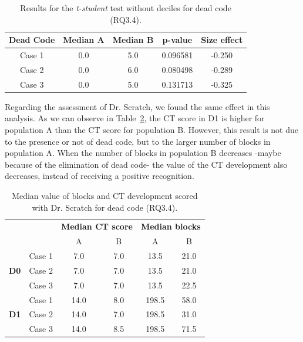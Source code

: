 \begin{table}
 \begin{center}
  \begin{tabular}{|c|c|c|c|c|}
    \hline
    \textbf{Dead Code} & \textbf{Median A} & \textbf{Median B} & \textbf{p-value} & \textbf{Size effect} \\ \hline
    Case 1 & 0.0 & 5.0 & 0.096581 & -0.250 \\ \hline
    Case 2 & 0.0 & 6.0 & 0.080498 & -0.289 \\ \hline
    Case 3 & 0.0 & 5.0 & 0.131713 & -0.325 \\ \hline
  \end{tabular}
  \caption{Results for the \textit{t-student} test without deciles for dead code (RQ3.4).}
  \label{table:rq3_4_statistical_results}
 \end{center}
\end{table}

Regarding the assessment of Dr. Scratch, we found the same effect in this analysis. As we can observe in Table~\ref{table:rq3_4_statistical_results_median}, the CT score in D1 is higher for population A than the CT score for population B. However, this result is not due to the presence or not of dead code, but to the larger number of blocks in population A. When the number of blocks in population B decreases -maybe because of the elimination of dead code- the value of the CT development also decreases, instead of receiving a positive recognition.


\begin{table}
 \begin{center}
  \begin{tabular}{|c|c|c|c|c|c|}
    \cline{3-6}
     \multicolumn{2}{c}{} & 
     \multicolumn{2}{|c|}{\textbf{Median CT score}} & \multicolumn{2}{|c|}{\textbf{Median blocks}} \\ 
     \cline{3-6}
     \multicolumn{2}{c|}{} & A & B & A & B \\ \hline
     \multirow{3}{*}{\textbf{D0}}
     & Case 1 & 7.0 & 7.0 & 13.5 & 21.0 \\
     & Case 2 & 7.0 & 7.0 & 13.5 & 21.0 \\
     & Case 3 & 7.0 & 7.0 & 13.5 & 22.5 \\ \hline
     \multirow{3}{*}{\textbf{D1}}
     & Case 1 & 14.0 & 8.0 & 198.5 & 58.0 \\
     & Case 2 & 14.0 & 7.0 & 198.5 & 31.0 \\
     & Case 3 & 14.0 & 8.5 & 198.5 & 71.5 \\ \hline
  \end{tabular}
  \caption{Median value of blocks and CT development scored with Dr. Scratch for dead code (RQ3.4).}
  \label{table:rq3_4_statistical_results_median}
 \end{center}
\end{table}



